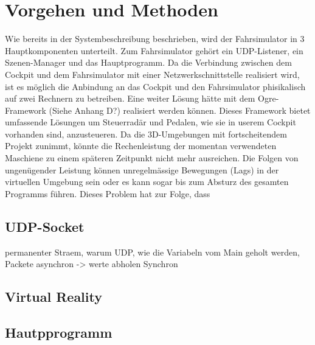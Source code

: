 \section{Vorgehen und Methoden}
Wie bereits in der Systembeschreibung beschrieben, wird der Fahrsimulator in 3 Hauptkomponenten unterteilt. Zum Fahrsimulator gehört ein UDP-Listener, ein Szenen-Manager und das Hauptprogramm. Da die Verbindung zwischen dem Cockpit und dem Fahrsimulator mit einer Netzwerkschnittstelle realisiert wird, ist es möglich die Anbindung an das Cockpit und den Fahrsimulator phisikalisch auf zwei Rechnern zu betreiben. Eine weiter Lösung hätte mit dem Ogre-Framework (Siehe Anhang D?) realisiert werden können. Dieses Framework bietet umfassende Lösungen um Steuerradär und Pedalen, wie sie in userem Cockpit vorhanden sind, anzusteueren.
Da die 3D-Umgebungen mit fortscheitendem Projekt zunimmt, könnte die Rechenleistung der momentan verwendeten Maschiene zu einem späteren Zeitpunkt nicht mehr ausreichen. Die Folgen von ungenügender Leistung können unregelmässige Bewegungen (Lags) in der virtuellen Umgebung sein oder es kann sogar bis zum Absturz des gesamten Programms führen. 
Dieses Problem hat zur Folge, dass
\subsection{UDP-Socket}
permanenter Straem, warum UDP, wie die Variabeln vom Main geholt werden, Packete asynchron -> werte abholen Synchron
\subsection{Virtual Reality}
\subsection{Hautpprogramm}

